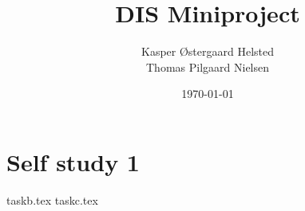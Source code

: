 \documentclass[twoside]{report}
\begin{document}
\pagestyle{empty} %
%
%

\title{DIS Miniproject}
\date{\today}
\author{Kasper Østergaard Helsted \\ Thomas Pilgaard Nielsen}

\maketitle

%
%


\chapter{Self study 1}
{taskb.tex}
{taskc.tex}

\end{document}
